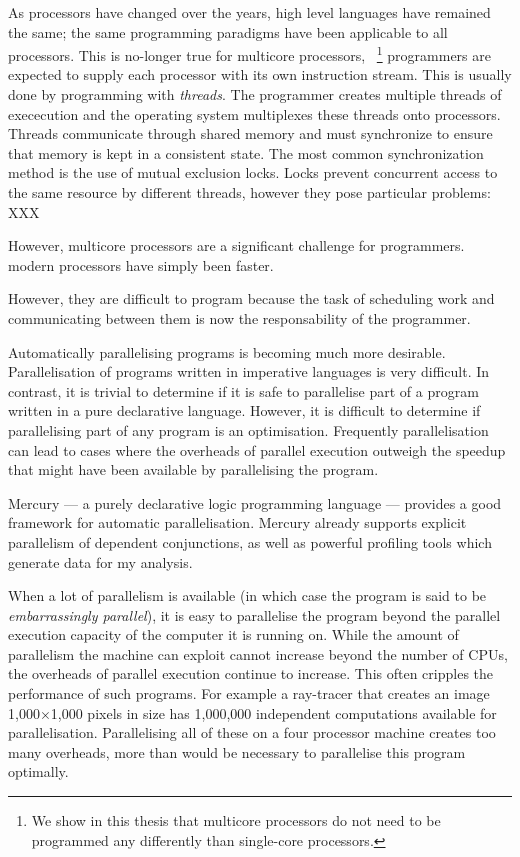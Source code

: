 
As processors have changed over the years,
high level languages have remained the same;
the same programming paradigms have been applicable to all processors.
This is no-longer true for multicore processors,~%
\footnote{We show in this thesis that multicore processors do not need to be
programmed any differently than single-core processors.}
programmers are expected to supply each processor with its own instruction
stream.
This is usually done by programming with \emph{threads}.
The programmer creates multiple threads of exececution and the operating system
multiplexes these threads onto processors.
Threads communicate through shared memory and must synchronize to ensure that
memory is kept in a consistent state.
The most common synchronization method is the use of mutual exclusion locks.
Locks prevent concurrent access to the same resource by different threads,
however they pose particular problems: XXX



However, multicore processors are a significant challenge for programmers.
modern processors have simply been faster.



However, they are difficult to program because the task of scheduling work and
communicating between them is now the responsability of the programmer.



Automatically parallelising programs is becoming much more desirable.
Parallelisation of programs written in imperative languages is very
difficult.  In contrast, it is trivial to determine if it is safe to
parallelise part of a program written in a pure declarative language.
However, it is difficult to determine if parallelising part of any
program is an optimisation.  Frequently parallelisation can lead to
cases where the overheads of parallel execution outweigh the speedup
that might have been available by parallelising the program.

Mercury --- a purely declarative logic programming language ---
provides a good framework for automatic parallelisation.  Mercury
already supports explicit parallelism of dependent conjunctions, as
well as powerful profiling tools which generate data for my analysis.

When a lot of parallelism is available (in which case the program is said to
be \emph{embarrassingly parallel}), it is easy to parallelise the
program beyond the parallel execution capacity of the computer it is
running on.
While the amount of parallelism the machine can exploit
cannot increase beyond the number of CPUs,
the overheads of parallel execution continue to increase.
This often cripples the performance of such programs.
For example a ray-tracer that creates an image
1,000$\times$1,000 pixels in size has 1,000,000 independent computations
available for parallelisation.
Parallelising all of these on a four processor machine creates too
many overheads, more than would be necessary to parallelise this program
optimally.

